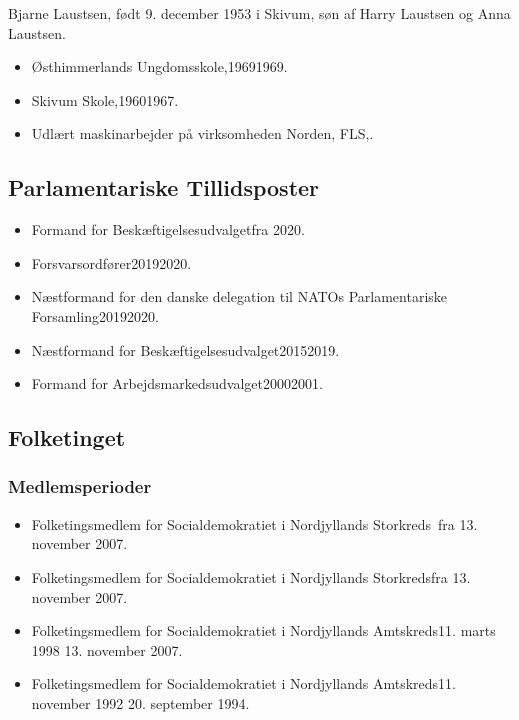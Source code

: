\documentclass[11pt, a4paper]{awesome-cv}
\begin{document}
\makecvheader[R]
\makelettertitle
\begin{cvletter}
Bjarne Laustsen, født 9. december 1953 i Skivum, søn af Harry Laustsen og Anna Laustsen.

\begin{itemize}
\item Østhimmerlands Ungdomsskole,19691969.
\item Skivum Skole,19601967.
\item Udlært maskinarbejder på virksomheden Norden, FLS,.
\end{itemize}
\subsection*{Parlamentariske Tillidsposter}
\begin{itemize}
\item Formand for Beskæftigelsesudvalgetfra 2020.
\item Forsvarsordfører20192020.
\item Næstformand for den danske delegation til NATOs Parlamentariske Forsamling20192020.
\item Næstformand for Beskæftigelsesudvalget20152019.
\item Formand for Arbejdsmarkedsudvalget20002001.
\end{itemize}
\subsection*{Folketinget}
\subsubsection*{Medlemsperioder}
\begin{itemize}
\item Folketingsmedlem for Socialdemokratiet i Nordjyllands Storkreds fra 13. november 2007.
\item Folketingsmedlem for Socialdemokratiet i Nordjyllands Storkredsfra 13. november 2007.
\item Folketingsmedlem for Socialdemokratiet i Nordjyllands Amtskreds11. marts 1998  13. november 2007.
\item Folketingsmedlem for Socialdemokratiet i Nordjyllands Amtskreds11. november 1992  20. september 1994.
\end{itemize}

\end{cvletter}
\end{document}
